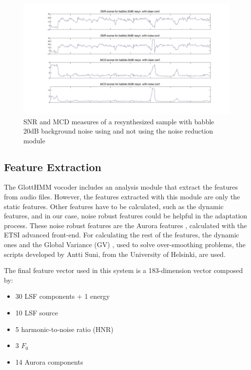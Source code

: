 \begin{figure}[!hb]
\begin{adjustwidth}{-2.6cm}{}
\includegraphics[width=1.3\textwidth]{images/babble20clean_vs_noise.jpg}
\end{adjustwidth}
\caption{SNR and MCD measures of a resynthesized sample with babble 20dB background noise using and not using the noise reduction module}
\label{fig:babble20_clean_vs_noise}
\end{figure}

\subsection{Feature Extraction}
\label{experiments_feature_extraction}
The GlottHMM vocoder includes an analysis module that extract the features from audio files.
%
However, the features extracted with this module are only the static features. 
%
Other features have to be calculated, such as the dynamic features, and in our case, noise robust features could be helpful in the adaptation process.
%
These noise robust features are the Aurora features \cite{etsi202}, calculated with the ETSI advanced front-end.
%
For calculating the rest of the features, the dynamic ones and the Global Variance (GV) \cite{toda2005speech}, used to solve over-smoothing problems, the scripts developed by Antti Suni, from the University of Helsinki, are used.

The final feature vector used in this system is a 183-dimension vector composed by:

\begin{itemize}
	\item 30 LSF components + 1 energy
	\item 10 LSF source
	\item 5 harmonic-to-noise ratio (HNR)
	\item 3  $F_{0}$
	\item 14 Aurora components
\end{itemize}

